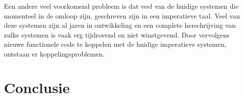 \documentclass[twoside,twocolumn]{article}
\begin{document}
Een andere veel voorkomend probleem is dat veel van de huidige systemen die
momenteel in de omloop zijn, geschreven zijn in een imperatieve taal. Veel van
deze systemen zijn al jaren in ontwikkeling en een complete herschrijving van
zulke systemen is vaak erg tijdrovend en niet winstgevend. Door vervolgens
nieuwe functionele code te koppelen met de huidige imperatieve systemen,
ontstaan er koppelingsproblemen.

\section{Conclusie}
\blindtext %





\clearpage



\end{document}
